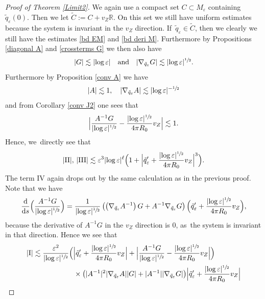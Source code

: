 \documentclass[10pt]{amsart}
\let\epsilon\varepsilon
\newcommand{\rI}{\mathrm{I}}
\newcommand{\rII}{\mathrm{II}}
\newcommand{\rIII}{\mathrm{III}}
\newcommand{\rIV}{\mathrm{IV}}
\theoremstyle{definition}
\newcommand\R{\mathbb{R}}
\newcommand\eq{=}
\let\eps\epsilon
\begin{document}
\begin{proof}[Proof of Theorem \ref{Limit2}]
We again use a compact set $C\subset M_\eps$ containing $\tilde{q}_\eps(0)$. Then we let $\tilde{C}:=C+v_Z\R$. On this set we still have uniform estimates because the system is invariant in the $v_Z$ direction. If~$\tilde{q}_\eps\in \tilde{C}$, then we clearly we still have the estimates \eqref{bd EM} and \eqref{bd deri M}. Furthermore by Propositions \ref{diagonal A} and \ref{crossterms G} we then also have
\begin{align*}
|G|\lesssim |{\log\eps}|
\quad\text{and}\quad
|\nabla_{\tilde{q}_\eps}G|\lesssim |{\log\eps}|^{\sfrac{1}{2}}.
\end{align*}
Furthermore by Proposition \ref{conv A} we have
\begin{align*}
|A|\lesssim 1,\quad |\nabla_{\tilde{q}_\eps}A|\lesssim |{\log\eps}|^{-\sfrac{1}{2}}
\end{align*}
and from Corollary \ref{conv J2} one sees that
\begin{align*}
\Bigl|\frac{A^{-1}G}{|{\log\eps}|^{\sfrac{1}{2}}}-\frac{|{\log\eps}|^{\sfrac{1}{2}}}{4\pi R_0}v_Z \Bigr|\lesssim 1.
\end{align*}
Hence, we~directly see that
\begin{align*}
|\rII|,\,|\rIII|\lesssim \eps^3|{\log\eps}|^\ell \Bigl(1+ \Bigl|\tilde{q}_\eps'+\frac{|{\log\eps}|^{\sfrac{1}{2}}}{4\pi R_0}v_Z \Bigr|^3 \Bigr).
\end{align*}
The term $\rIV$ again drops out by the same calculation as in the previous proof. Note that we have
\begin{align*}
\frac{\text{d}}{\text{d}s} \Bigl(\frac{A^{-1}G}{|{\log\eps}|^{\sfrac{1}{2}}} \Bigr)\eq\frac{1}{|{\log\eps}|^{\sfrac{1}{2}}}\left(\left(\nabla_{\tilde{q}_\eps}A^{-1}\right)G+A^{-1}\nabla_{\tilde{q}_\eps}G\right) \Bigl(\tilde{q}_\eps'+\frac{|{\log\eps}|^{\sfrac{1}{2}}}{4\pi R_0}v_Z \Bigr),
\end{align*}
because the derivative of $A^{-1}G$ in the $v_Z$ direction is $0$, as~the system is invariant in that direction.
Hence we see that
\begin{align*}
|\rI|&\lesssim\frac{\eps^2}{|{\log\eps}|^{\sfrac{1}{2}}} \Bigl(\Bigl|\tilde{q}_\eps'+\frac{|{\log\eps}|^{\sfrac{1}{2}}}{4\pi R_0}v_Z \Bigr|+ \Bigl|\frac{A^{-1}G}{|{\log\eps}|^{\sfrac{1}{2}}}-\frac{|{\log\eps}|^{\sfrac{1}{2}}}{4\pi R_0}v_Z \Bigr| \Bigr)\\
&\hspace*{2cm}\times\left(|A^{-1}|^2|\nabla_{\tilde{q}_\eps}A||G|+|A^{-1}||\nabla_{\tilde{q}_\eps}G|\right) \Bigr|\tilde{q}_\eps'+\frac{|{\log\eps}|^{\sfrac{1}{2}}}{4\pi R_0}v_Z \Bigr|\\

\end{align*}
\end{proof}
\end{document}

